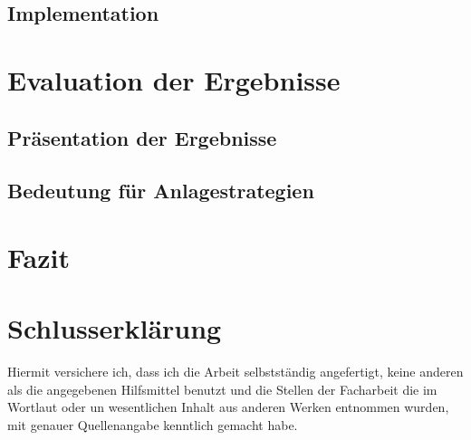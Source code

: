 \documentclass[12pt, a4paper, titlepage]{report}
\begin{document}
        \section{Implementation}

    \chapter{Evaluation der Ergebnisse}

        \section{Präsentation der Ergebnisse}

        \section{Bedeutung für Anlagestrategien}

    \chapter{Fazit}

    \chapter{Schlusserklärung}
    Hiermit versichere ich, dass ich die Arbeit selbstständig angefertigt, keine anderen als die angegebenen Hilfsmittel benutzt und die Stellen der Facharbeit die im Wortlaut oder un wesentlichen Inhalt aus anderen Werken entnommen wurden, mit genauer Quellenangabe kenntlich gemacht habe.
\end{document}
